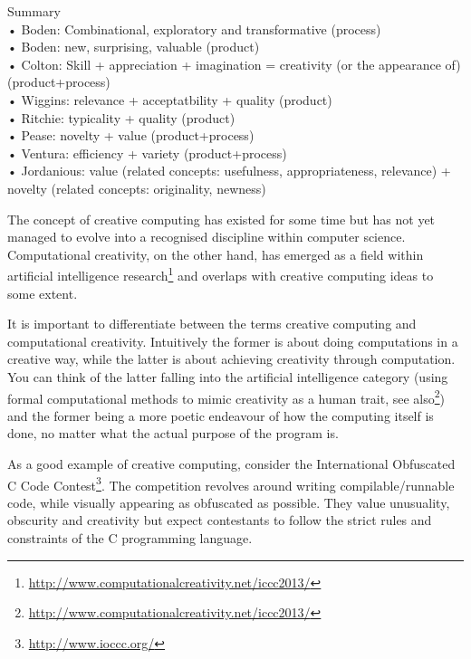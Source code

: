 \begin{shaded}
  Summary\\
  •	Boden: Combinational, exploratory and transformative \citep{Boden2003, Wiggins2006} (process)\\
  •	Boden: new, surprising, valuable \citep{Boden2003} (product)\\
  •	Colton: Skill + appreciation + imagination = creativity (or the appearance of) \citep{Colton2008a} (product+process)\\
  •	Wiggins: relevance + acceptatbility + quality \citep{Wiggins2006} (product)\\
  •	Ritchie: typicality + quality \citep{Ritchie2001, Ritchie2007} (product)\\
  •	Pease: novelty + value \citep{Pease2001} (product+process)\\
  •	Ventura: efficiency + variety \citep{Ventura2008} (product+process)\\
  •	Jordanious: value (related concepts: usefulness, appropriateness, relevance) + novelty (related concepts: originality, newness) \citep{Jordanous2012}
\end{shaded}


The concept of creative computing has existed for some time but has not yet managed to evolve into a recognised discipline within computer science. Computational creativity, on the other hand, has emerged as a field within artificial intelligence research\footnote{\url{http://www.computationalcreativity.net/iccc2013/}} and overlaps with creative computing ideas to some extent.

It is important to differentiate between the terms creative computing and computational creativity. Intuitively the former is about doing computations in a creative way, while the latter is about achieving creativity through computation. You can think of the latter falling into the artificial intelligence category (using formal computational methods to mimic creativity as a human trait, see also\footnote{\url{http://www.computationalcreativity.net/iccc2013/}}) and the former being a more poetic endeavour of how the computing itself is done, no matter what the actual purpose of the program is.

As a good example of creative computing, consider the International Obfuscated C Code Contest\footnote{\url{http://www.ioccc.org/}}. The competition revolves around writing compilable/runnable code, while visually appearing as obfuscated as possible. They value unusuality, obscurity and creativity but expect contestants to follow the strict rules and constraints of the C programming language.


